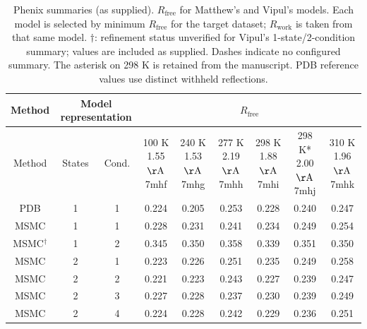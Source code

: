 \begin{table}[htbp]
\centering
\small
\begin{tabular}{|c|c|c|c|c|c|c|c|c|}
\hline
Method & \multicolumn{2}{c|}{Model representation} & \multicolumn{6}{c|}{$R_{\mathrm{free}}$} \\
\hline
Method & States & Cond. & \shortstack{100 K \\ 1.55 $\mathrm{\AA}$ \\ 7mhf} & \shortstack{240 K \\ 1.53 $\mathrm{\AA}$ \\ 7mhg} & \shortstack{277 K \\ 2.19 $\mathrm{\AA}$ \\ 7mhh} & \shortstack{298 K \\ 1.88 $\mathrm{\AA}$ \\ 7mhi} & \shortstack{298 K* \\ 2.00 $\mathrm{\AA}$ \\ 7mhj} & \shortstack{310 K \\ 1.96 $\mathrm{\AA}$ \\ 7mhk} \\
\hline
PDB & 1 & 1 & 0.224 & 0.205 & 0.253 & 0.228 & 0.240 & 0.247 \\ \hline
MSMC & 1 & 1 & 0.228 & 0.231 & 0.241 & 0.234 & 0.249 & 0.254 \\ \hline
MSMC$^{\dagger}$ & 1 & 2 & 0.345 & 0.350 & 0.358 & 0.339 & 0.351 & 0.350 \\ \hline
MSMC & 2 & 1 & 0.223 & 0.226 & 0.251 & 0.235 & 0.249 & 0.258 \\ \hline
MSMC & 2 & 2 & 0.221 & 0.223 & 0.243 & 0.227 & 0.239 & 0.247 \\ \hline
MSMC & 2 & 3 & 0.227 & 0.228 & 0.237 & 0.230 & 0.239 & 0.249 \\ \hline
MSMC & 2 & 4 & 0.224 & 0.228 & 0.242 & 0.229 & 0.236 & 0.251 \\ \hline
\end{tabular}
\caption{Phenix summaries (as supplied). $R_{\mathrm{free}}$ for Matthew's and Vipul's models. Each model is selected by minimum $R_{\mathrm{free}}$ for the target dataset; $R_{\mathrm{work}}$ is taken from that same model. $\dagger$: refinement status unverified for Vipul's 1-state/2-condition summary; values are included as supplied. Dashes indicate no configured summary. The asterisk on 298 K is retained from the manuscript. PDB reference values use distinct withheld reflections.}
\label{tab:combined_phenix_summary_r_free}
\end{table}
